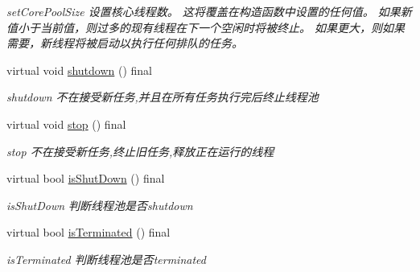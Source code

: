 \begin{DoxyCompactItemize}
\begin{DoxyCompactList}\small\item\em set\+Core\+Pool\+Size 设置核心线程数。 这将覆盖在构造函数中设置的任何值。 如果新值小于当前值，则过多的现有线程在下一个空闲时将被终止。 如果更大，则如果需要，新线程将被启动以执行任何排队的任务。 \end{DoxyCompactList}\item 
\mbox{\label{classThreadPoolExecutor_aaa834c4350d6b12826803bb13dd467ea}} 
virtual void \hyperlink{classThreadPoolExecutor_aaa834c4350d6b12826803bb13dd467ea}{shutdown} () final
\begin{DoxyCompactList}\small\item\em shutdown 不在接受新任务,并且在所有任务执行完后终止线程池 \end{DoxyCompactList}\item 
\mbox{\label{classThreadPoolExecutor_a588ec33baf402afd0e1c52b11d9234da}} 
virtual void \hyperlink{classThreadPoolExecutor_a588ec33baf402afd0e1c52b11d9234da}{stop} () final
\begin{DoxyCompactList}\small\item\em stop 不在接受新任务,终止旧任务,释放正在运行的线程 \end{DoxyCompactList}\item 
virtual bool \hyperlink{classThreadPoolExecutor_ac33c356670eabe5345992331e615348c}{is\+Shut\+Down} () final
\begin{DoxyCompactList}\small\item\em is\+Shut\+Down 判断线程池是否shutdown \end{DoxyCompactList}\item 
virtual bool \hyperlink{classThreadPoolExecutor_a89ed68d6c67ad6fbde73b7883c8107a7}{is\+Terminated} () final
\begin{DoxyCompactList}\small\item\em is\+Terminated 判断线程池是否terminated \end{DoxyCompactList}\end{DoxyCompactItemize}
